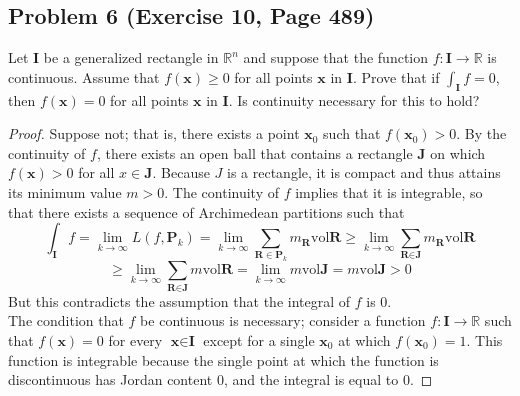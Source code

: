 \documentclass{article}
\begin{document}
\subsection*{Problem 6 (Exercise 10, Page 489)}
Let $\textbf{I}$ be a generalized rectangle in $\mathbb{R}^n$ and suppose that the function $f \colon \textbf{I} \to \mathbb{R}$ is continuous. Assume that $f(\textbf{x}) \geq 0$ for all points $\textbf{x}$ in $\textbf{I}$. Prove that if $\int_{\textbf{I}} f = 0$, then $f(\textbf{x}) = 0$ for all points $\textbf{x}$ in $\textbf{I}$. Is continuity necessary for this to hold?
\begin{proof}
Suppose not; that is, there exists a point $\textbf{x}_0$ such that $f(\textbf{x}_0) > 0 $. By the continuity of $f$, there exists an open ball that contains a rectangle $\textbf{J}$ on which $f(\textbf{x}) > 0$ for all $x \in \textbf{J}$. Because $J$ is a rectangle, it is compact and thus attains its minimum value $m > 0$. The continuity of $f$ implies that it is integrable, so that there exists a sequence of Archimedean partitions such that 
\[ \int_{\textbf{I}} f = \lim_{k \to \infty}L(f, \textbf{P}_k) = \lim_{k \to \infty} \sum_{\textbf{R} \in \textbf{P}_k} m_{\textbf{R}} \text{vol}\textbf{R} \geq \lim_{k \to \infty} \sum_{\textbf{R} \in \textbf{J}} m_{\textbf{R}} \text{vol}\textbf{R} \]
\[\geq \lim_{k \to \infty} \sum_{\textbf{R} \in \textbf{J}} m \text{vol}\textbf{R} = \lim_{k\to\infty} m\text{vol}\textbf{J} = m\text{vol}\textbf{J} > 0\]
But this contradicts the assumption that the integral of $f$ is 0. \\
The condition that $f$ be continuous is necessary; consider a function $f \colon \textbf{I} \to \mathbb{R}$ such that $f(\textbf{x}) = 0$ for every $\textbf{x} \in \textbf{I}$ except for a single $\textbf{x}_0$ at which $f(\textbf{x}_0) = 1$. This function is integrable because the single point at which the function is discontinuous has Jordan content 0, and the integral is equal to 0.  
\end{proof}
\end{document}
